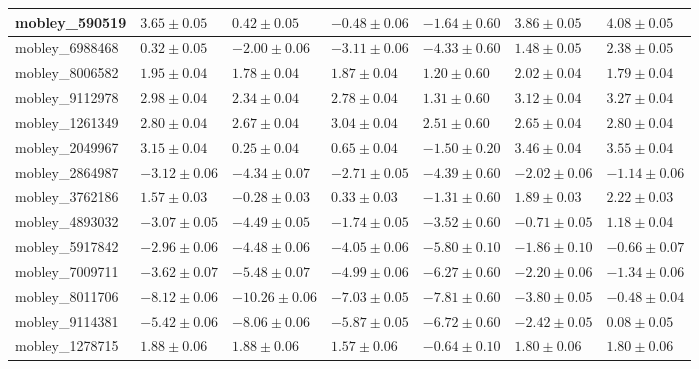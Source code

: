 \documentclass{article}
\begin{document}
\begin{landscape}
\begin{longtable}{|l{3.0cm}|l{3.0cm}|l{3.2cm}|l{3.6cm}|l{3.0cm}|l{3.0cm}|l{3.0cm}|}
mobley\_590519	&	$	3.65	\pm	0.05	$	&	$	0.42	\pm	0.05	$	&	$	-0.48	\pm	0.06	$	&	$	-1.64	\pm	0.60	$	&	$	3.86	\pm	0.05	$	&	$	4.08	\pm	0.05	$	\\ \hline
mobley\_6988468	&	$	0.32	\pm	0.05	$	&	$	-2.00	\pm	0.06	$	&	$	-3.11	\pm	0.06	$	&	$	-4.33	\pm	0.60	$	&	$	1.48	\pm	0.05	$	&	$	2.38	\pm	0.05	$	\\ \hline
mobley\_8006582	&	$	1.95	\pm	0.04	$	&	$	1.78	\pm	0.04	$	&	$	1.87	\pm	0.04	$	&	$	1.20	\pm	0.60	$	&	$	2.02	\pm	0.04	$	&	$	1.79	\pm	0.04	$	\\ \hline
mobley\_9112978	&	$	2.98	\pm	0.04	$	&	$	2.34	\pm	0.04	$	&	$	2.78	\pm	0.04	$	&	$	1.31	\pm	0.60	$	&	$	3.12	\pm	0.04	$	&	$	3.27	\pm	0.04	$	\\ \hline
mobley\_1261349	&	$	2.80	\pm	0.04	$	&	$	2.67	\pm	0.04	$	&	$	3.04	\pm	0.04	$	&	$	2.51	\pm	0.60	$	&	$	2.65	\pm	0.04	$	&	$	2.80	\pm	0.04	$	\\ \hline
mobley\_2049967	&	$	3.15	\pm	0.04	$	&	$	0.25	\pm	0.04	$	&	$	0.65	\pm	0.04	$	&	$	-1.50	\pm	0.20	$	&	$	3.46	\pm	0.04	$	&	$	3.55	\pm	0.04	$	\\ \hline
mobley\_2864987	&	$	-3.12	\pm	0.06	$	&	$	-4.34	\pm	0.07	$	&	$	-2.71	\pm	0.05	$	&	$	-4.39	\pm	0.60	$	&	$	-2.02	\pm	0.06	$	&	$	-1.14	\pm	0.06	$	\\ \hline
mobley\_3762186	&	$	1.57	\pm	0.03	$	&	$	-0.28	\pm	0.03	$	&	$	0.33	\pm	0.03	$	&	$	-1.31	\pm	0.60	$	&	$	1.89	\pm	0.03	$	&	$	2.22	\pm	0.03	$	\\ \hline
mobley\_4893032	&	$	-3.07	\pm	0.05	$	&	$	-4.49	\pm	0.05	$	&	$	-1.74	\pm	0.05	$	&	$	-3.52	\pm	0.60	$	&	$	-0.71	\pm	0.05	$	&	$	1.18	\pm	0.04	$	\\ \hline
mobley\_5917842	&	$	-2.96	\pm	0.06	$	&	$	-4.48	\pm	0.06	$	&	$	-4.05	\pm	0.06	$	&	$	-5.80	\pm	0.10	$	&	$	-1.86	\pm	0.10	$	&	$	-0.66	\pm	0.07	$	\\ \hline
mobley\_7009711	&	$	-3.62	\pm	0.07	$	&	$	-5.48	\pm	0.07	$	&	$	-4.99	\pm	0.06	$	&	$	-6.27	\pm	0.60	$	&	$	-2.20	\pm	0.06	$	&	$	-1.34	\pm	0.06	$	\\ \hline
mobley\_8011706	&	$	-8.12	\pm	0.06	$	&	$	-10.26	\pm	0.06	$	&	$	-7.03	\pm	0.05	$	&	$	-7.81	\pm	0.60	$	&	$	-3.80	\pm	0.05	$	&	$	-0.48	\pm	0.04	$	\\ \hline
mobley\_9114381	&	$	-5.42	\pm	0.06	$	&	$	-8.06	\pm	0.06	$	&	$	-5.87	\pm	0.05	$	&	$	-6.72	\pm	0.60	$	&	$	-2.42	\pm	0.05	$	&	$	0.08	\pm	0.05	$	\\ \hline
mobley\_1278715	&	$	1.88	\pm	0.06	$	&	$	1.88	\pm	0.06	$	&	$	1.57	\pm	0.06	$	&	$	-0.64	\pm	0.10	$	&	$	1.80	\pm	0.06	$	&	$	1.80	\pm	0.06	$	\\ \hline

\end{longtable}
\end{landscape}
\end{document}
